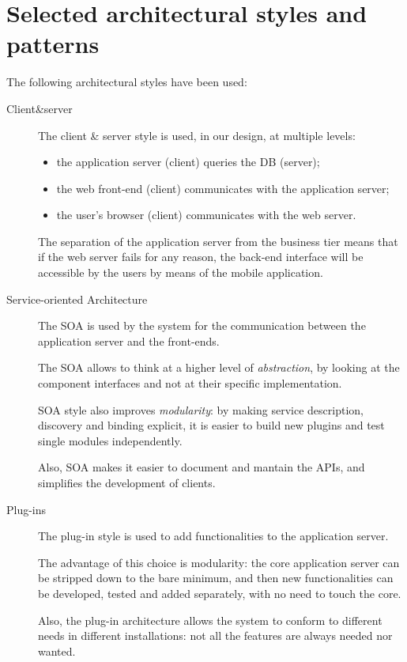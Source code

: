 \section{Selected architectural styles and patterns}
\label{sec:styles-patterns}

The following architectural styles have been used:

\begin{description}
\item[Client\&server]
The client \& server style is used, in our design, at multiple levels:
\begin{itemize}
    \item the application server (client) queries the DB (server);
    \item the web front-end (client) communicates with the application server;
    \item the user's browser (client) communicates with the web server.
\end{itemize}

The separation of the application server from the business tier means that if the web server fails for any reason, the back-end interface will be accessible by the users by means of the mobile application.

\item[Service-oriented Architecture]
The SOA is used by the system for the communication between the application server and the front-ends.

The SOA allows to think at a higher level of \emph{abstraction}, by looking at the component interfaces and not at their specific implementation.

SOA style also improves \emph{modularity}: by making service description, discovery and binding explicit, it is easier to build new plugins and test single modules independently.

Also, SOA makes it easier to document and mantain the APIs, and simplifies the development of clients.

\item[Plug-ins]
The plug-in style is used to add functionalities to the application server.

The advantage of this choice is modularity: the core application server can be stripped down to the bare minimum, and then new functionalities can be developed, tested and added separately, with no need to touch the core.

Also, the plug-in architecture allows the system to conform to different needs in different installations: not all the features are always needed nor wanted.


\end{description}

